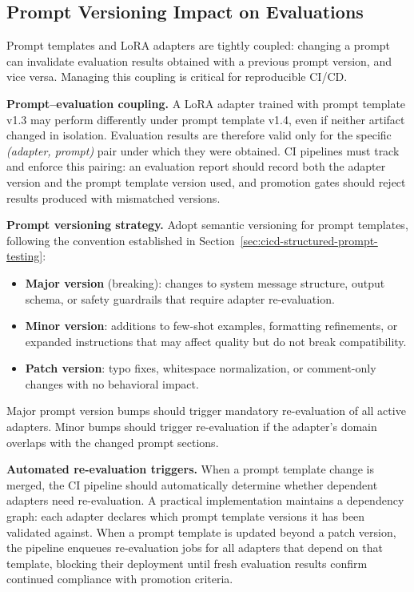 \subsection{Prompt Versioning Impact on Evaluations}
\label{subsec:ch04-prompt-versioning-impact}

Prompt templates and LoRA adapters are tightly coupled: changing a prompt can invalidate evaluation results obtained with a previous prompt version, and vice versa. Managing this coupling is critical for reproducible CI/CD.

\medskip
\noindent\textbf{Prompt--evaluation coupling.} A LoRA adapter trained with prompt template v1.3 may perform differently under prompt template v1.4, even if neither artifact changed in isolation. Evaluation results are therefore valid only for the specific \emph{(adapter, prompt)} pair under which they were obtained. CI pipelines must track and enforce this pairing: an evaluation report should record both the adapter version and the prompt template version used, and promotion gates should reject results produced with mismatched versions.

\medskip
\noindent\textbf{Prompt versioning strategy.} Adopt semantic versioning for prompt templates, following the convention established in Section~\ref{sec:cicd-structured-prompt-testing}:
\begin{itemize}
    \item \textbf{Major version} (breaking): changes to system message structure, output schema, or safety guardrails that require adapter re-evaluation.
    \item \textbf{Minor version}: additions to few-shot examples, formatting refinements, or expanded instructions that may affect quality but do not break compatibility.
    \item \textbf{Patch version}: typo fixes, whitespace normalization, or comment-only changes with no behavioral impact.
\end{itemize}
Major prompt version bumps should trigger mandatory re-evaluation of all active adapters. Minor bumps should trigger re-evaluation if the adapter's domain overlaps with the changed prompt sections.

\medskip
\noindent\textbf{Automated re-evaluation triggers.} When a prompt template change is merged, the CI pipeline should automatically determine whether dependent adapters need re-evaluation. A practical implementation maintains a dependency graph: each adapter declares which prompt template versions it has been validated against. When a prompt template is updated beyond a patch version, the pipeline enqueues re-evaluation jobs for all adapters that depend on that template, blocking their deployment until fresh evaluation results confirm continued compliance with promotion criteria.

